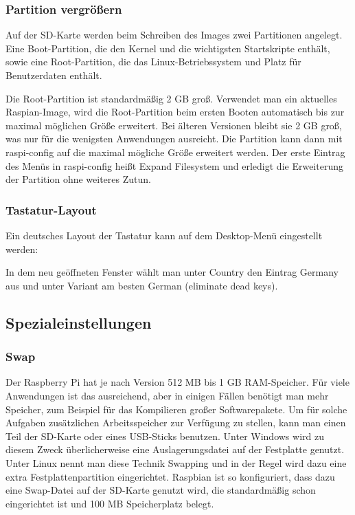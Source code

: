 
\subsubsection{Partition vergrößern}

Auf der SD-Karte werden beim Schreiben des Images zwei Partitionen angelegt. Eine Boot-Partition, die den Kernel und die wichtigsten Startskripte enthält, sowie eine Root-Partition, die das Linux-Betriebssystem und Platz für Benutzerdaten enthält.

Die Root-Partition ist standardmäßig 2 GB groß. Verwendet man ein aktuelles Raspian-Image, wird die Root-Partition beim ersten Booten automatisch bis zur maximal möglichen Größe erweitert. Bei älteren Versionen bleibt sie 2 GB groß, was nur für die wenigsten Anwendungen ausreicht. Die Partition kann dann mit \textsf{raspi-config} auf die maximal mögliche Größe erweitert werden. Der erste Eintrag des Menüs in \textsf{raspi-config} heißt \textsf{Expand Filesystem} und erledigt die Erweiterung der Partition ohne weiteres Zutun.


\subsubsection{Tastatur-Layout}

Ein deutsches Layout der Tastatur kann auf dem Desktop-Menü eingestellt werden: 


 In dem neu geöffneten Fenster wählt man unter \textsf{Country} den Eintrag \textsf{Germany}
  aus und unter \textsf{Variant} am besten \textsf{German (eliminate dead keys)}.


\subsection{Spezialeinstellungen}

\subsubsection{Swap}

Der Raspberry Pi hat je nach Version 512 MB bis 1 GB RAM-Speicher. Für viele Anwendungen ist das ausreichend, aber in einigen Fällen benötigt man mehr Speicher, zum Beispiel für das Kompilieren großer Softwarepakete. Um für solche Aufgaben zusätzlichen Arbeitsspeicher zur Verfügung zu stellen, kann man einen Teil der SD-Karte oder eines USB-Sticks benutzen. Unter Windows wird zu diesem Zweck überlicherweise eine Auslagerungsdatei auf der Festplatte genutzt. Unter Linux nennt man diese Technik Swapping und in der Regel wird dazu eine extra Festplattenpartition eingerichtet. Raspbian ist so konfiguriert, dass dazu eine Swap-Datei auf der SD-Karte genutzt wird, die standardmäßig schon eingerichtet ist und 100 MB Speicherplatz belegt.

